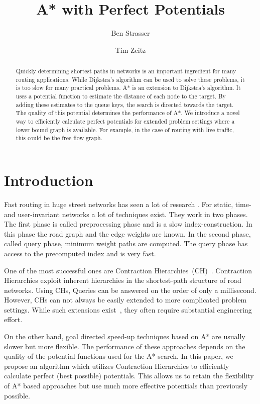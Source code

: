 \documentclass[a4paper,UKenglish,cleveref, autoref]{lipics-v2019}
\title{A* with Perfect Potentials} %
\author{Ben Strasser}{Germany}{academia@ben-strasser.net}{}{}%
\author{Tim Zeitz}{Institute of Theoretical Informatics, Algorithmics I, Karlsruhe Institute of Technology, Germany}{tim.zeitz@kit.edu}{}{}
\begin{document}
\maketitle

\begin{abstract}
Quickly determining shortest paths in networks is an important ingredient for many routing applications.
While Dijkstra's algorithm can be used to solve these problems, it is too slow for many practical problems.
A* is an extension to Dijkstra's algorithm.
It uses a potential function to estimate the distance of each node to the target.
By adding these estimates to the queue keys, the search is directed towards the target.
The quality of this potential determines the performance of A*.
We introduce a novel way to efficiently calculate perfect potentials for extended problem settings where a lower bound graph is available.
For example, in the case of routing with live traffic, this could be the free flow graph.
\end{abstract}

\section{Introduction}
\label{sec:intro}

Fast routing in huge street networks has seen a lot of research \cite{bdgmpsww-rptn-16}.
For static, time- and user-invariant networks a lot of techniques exist.
They work in two phases.
The first phase is called preprocessing phase and is a slow index-construction.
In this phase the road graph and the edge weights are known.
In the second phase, called query phase, minimum weight paths are computed.
The query phase has access to the precomputed index and is very fast.

One of the most successful ones are Contraction Hierarchies~(CH)~\cite{gssv-erlrn-12}.
Contraction Hierarchies exploit inherent hierarchies in the shortest-path structure of road networks.
Using CHs, Queries can be answered on the order of only a millisecond.
However, CHs can not always be easily extended to more complicated problem settings.
While such extensions exist~\cite{dsw-cch-15,bgsv-mtdtt-13}, they often require substantial engineering effort.

On the other hand, goal directed speed-up techniques based on A* are usually slower but more flexible.
The performance of these approaches depends on the quality of the potential functions used for the A* search.
In this paper, we propose an algorithm which utilizes Contraction Hierarchies to efficiently calculate perfect (best possible) potentials.
This allows us to retain the flexibility of A* based approaches but use much more effective potentials than previously possible.
\end{document}
